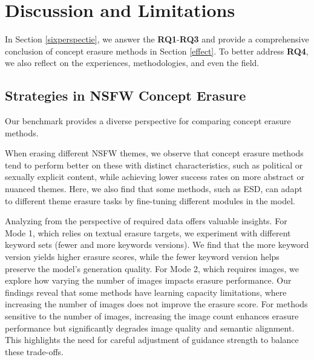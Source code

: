 \section{Discussion and Limitations}
\label{discuss}
In Section \ref{sixperspectie}, we answer the \textbf{RQ1}-\textbf{RQ3} and provide a comprehensive conclusion of concept erasure methods in Section \ref{effect}. To better address \textbf{RQ4}, we also reflect on the experiences, methodologies, and even the field.


\subsection{Strategies in NSFW Concept Erasure}
Our benchmark provides a diverse perspective for comparing concept erasure methods.

When erasing different NSFW themes, we observe that concept erasure methods tend to perform better on these with distinct characteristics, such as political or sexually explicit content, while achieving lower success rates on more abstract or nuanced themes.
Here, we also find that some methods, such as ESD, can adapt to different theme erasure tasks by fine-tuning different modules in the model.

Analyzing from the perspective of required data offers valuable insights. For Mode 1, which relies on textual erasure targets, we experiment with different keyword sets (fewer and more keywords versions). We find that the more keyword version yields higher erasure scores, while the fewer keyword version helps preserve the model's generation quality.
For Mode 2, which requires images, we explore how varying the number of images impacts erasure performance. Our findings reveal that some methods have learning capacity limitations, where increasing the number of images does not improve the erasure score. For methods sensitive to the number of images, increasing the image count enhances erasure performance but significantly degrades image quality and semantic alignment. This highlights the need for careful adjustment of guidance strength to balance these trade-offs.


